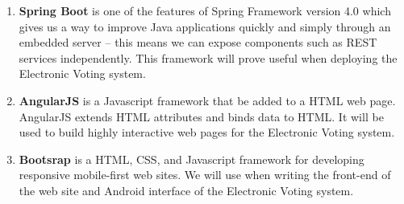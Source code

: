 \begin{enumerate}

		\item \textbf{Spring Boot} is one of the features of Spring Framework version 4.0 which gives us a way to improve Java applications quickly and simply through an embedded server – this means we can expose components such as REST services independently. This framework will prove useful when deploying the Electronic Voting system. 
		
		\item \textbf{AngularJS} is a Javascript framework that be added to a HTML web page. AngularJS extends HTML attributes and binds data to HTML. It will be used to build highly interactive web pages for the Electronic Voting system. 
		
		\item \textbf{Bootsrap} is a HTML, CSS, and Javascript framework for developing responsive mobile-first web sites. We will use when writing the front-end of the web site and Android interface of the Electronic Voting system. 
		
		
\end{enumerate} 